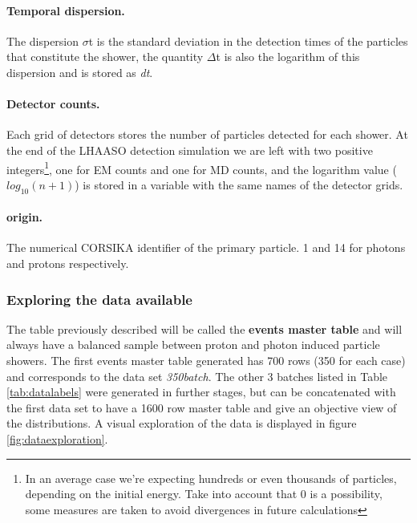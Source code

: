 \documentclass{article}
\begin{document}
\paragraph{Temporal dispersion.} The dispersion $\sigma$t is the standard deviation in the detection times of the particles that constitute the shower, the quantity $\Delta$t is also the logarithm of this dispersion and is stored as \emph{dt}.
\paragraph{Detector counts.} Each grid of detectors stores the number of particles detected for each shower. At the end of the LHAASO detection simulation we are left with two positive integers\footnote{In an average case we're expecting hundreds or even thousands of particles, depending on the initial energy. Take into account that 0 is a possibility, some measures are taken to avoid divergences in future calculations}, one for EM counts and one for MD counts,  and the logarithm value ($log_{10}(n+1)$) is stored in a variable with the same names of the detector grids.
\paragraph{origin.} The numerical CORSIKA identifier of the primary particle. 1 and 14 for photons and protons respectively.

\subsubsection{Exploring the data available}
The table previously described will be called the \textbf{events master table} and will always have a balanced sample between proton and photon induced particle showers. The first events master table generated has 700 rows (350 for each case) and corresponds to the data set \emph{350batch}. The other 3 batches listed in Table \ref{tab:datalabels} were generated in further stages, but can be concatenated with the first data set to have a 1600 row master table and give an objective view of the distributions. A visual exploration of the data is displayed in figure \ref{fig:dataexploration}.
\end{document}
